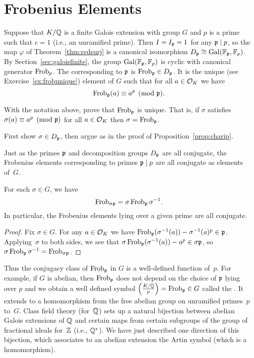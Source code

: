 \section{Frobenius Elements}

Suppose that $K/\mathbb{Q}$ is a finite Galois extension with group $G$ and $p$ is a
prime such that $e = 1$ (i.e., an unramified prime). Then $I = I_{\mathfrak{p}} = 1$ for
any $\mathfrak{p}\mid p$, so the map $\varphi$ of Theorem~\ref{thm:redsurj} is a canonical
isomorphism $D_{\mathfrak{p}} \cong \operatorname{Gal}(\mathbb{F}_{\mathfrak{p}},\mathbb{F}_p)$. By Section~\ref{sec:galoisfinite},
the group $\operatorname{Gal}(\mathbb{F}_{\mathfrak{p}},\mathbb{F}_p)$ is cyclic with canonical generator $\operatorname{Frob}_p$.
The  corresponding to $\mathfrak{p}$ is $\operatorname{Frob}_{\mathfrak{p}} \in D_{\mathfrak{p}}$.
It is the unique (see Exercise~\ref{ex:frobunique}) element of $G$ such that
for all $a \in \mathcal{O}_K$ we have
\[
  \operatorname{Frob}_{\mathfrak{p}}(a) \equiv a^p\pmod{\mathfrak{p}}.
\]

\begin{exercise}\label{ex:frobunique}
  With the notation above, prove that $\operatorname{Frob}_{\mathfrak{p}}$ is unique.
  That is, if $\sigma$ satisfies $\sigma(a) \equiv a^p \pmod{\mathfrak{p}}$
  for all $a\in\mathcal{O}_K$ then $\sigma = \operatorname{Frob}_{\mathfrak{p}}$.
  
  \begin{hint}
    First show $\sigma\in D_{\mathfrak{p}}$, then argue as in
    the proof of Proposition~\ref{prop:charip}.
  \end{hint}
\end{exercise}


Just as the primes $\mathfrak{p}$ and decomposition groups $D_{\mathfrak{p}}$ are all
conjugate, the Frobenius elements corresponding to primes
$\mathfrak{p}\mid p$ are all conjugate as elements of~$G$.

\begin{proposition}
  For each $\sigma \in G$, we have
  \[
    \operatorname{Frob}_{\sigma\mathfrak{p}} = \sigma\operatorname{Frob}_{\mathfrak{p}}\sigma^{-1}.
  \]
  In particular, the Frobenius elements lying over a given
  prime are all conjugate.
\end{proposition}
\begin{proof}
  Fix $\sigma\in G$. For any $a\in\mathcal{O}_K$ we have
  $\operatorname{Frob}_{\mathfrak{p}}(\sigma^{-1}(a)) - \sigma^{-1}(a)^p \in \mathfrak{p}$.
  Applying~$\sigma$ to both sides, we see that
  $\sigma\operatorname{Frob}_{\mathfrak{p}}(\sigma^{-1}(a)) - a^p \in \sigma\mathfrak{p}$,
  so $\sigma\operatorname{Frob}_{\mathfrak{p}}\sigma^{-1} = \operatorname{Frob}_{\sigma \mathfrak{p}}$.
\end{proof}

Thus the conjugacy class of $\operatorname{Frob}_{\mathfrak{p}}$ in $G$ is a well-defined
function of~$p$.  For example, if $G$ is abelian, then $\operatorname{Frob}_{\mathfrak{p}}$ does
not depend on the choice of $\mathfrak{p}$ lying over $p$ and we obtain a well
defined symbol $\left(\frac{K/\mathbb{Q}}{p}\right) = \operatorname{Frob}_{\mathfrak{p}}\in G$ called the .
It extends to a homomorphism from the free abelian
group on unramified primes~$p$ to~$G$.
Class field theory (for~$\mathbb{Q}$) sets up a natural bijection
between abelian Galois extensions of $\mathbb{Q}$ and certain maps from
certain subgroups of the group of fractional ideals for~$\mathbb{Z}$ (i.e., $\mathbb{Q}^*$).
We have just described one direction of this bijection, which associates to an
abelian extension the Artin symbol (which is a homomorphism).

